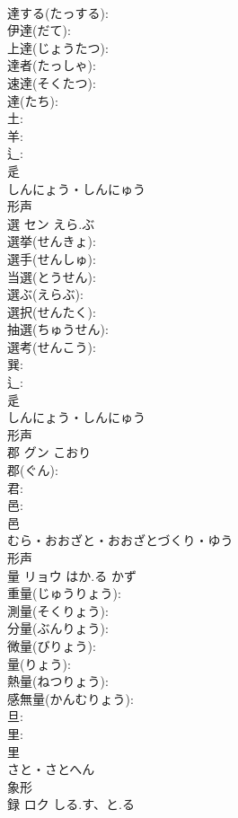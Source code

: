 \documentclass[8pt]{extreport}
\begin{document}
\begin{CJK}{UTF8}{min}
\\	達する(たっする): 
\\	伊達(だて): 
\\	上達(じょうたつ): 
\\	達者(たっしゃ): 
\\	速達(そくたつ): 
\\	達(たち): 
\\	土: 
\\	羊: 
\\	辶: 
\\	辵	
\\	しんにょう・しんにゅう	
\\	形声 
\\	選	セン	えら.ぶ		
\\	選挙(せんきょ): 
\\	選手(せんしゅ): 
\\	当選(とうせん): 
\\	選ぶ(えらぶ): 
\\	選択(せんたく): 
\\	抽選(ちゅうせん): 
\\	選考(せんこう): 
\\	巽: 
\\	辶: 
\\	辵	
\\	しんにょう・しんにゅう	
\\	形声 
\\	郡	グン	こおり		
\\	郡(ぐん): 
\\	君: 
\\	邑: 
\\	邑	
\\	むら・おおざと・おおざとづくり・ゆう	
\\	形声 
\\	量	リョウ	はか.る	かず	
\\	重量(じゅうりょう): 
\\	測量(そくりょう): 
\\	分量(ぶんりょう): 
\\	微量(びりょう): 
\\	量(りょう): 
\\	熱量(ねつりょう): 
\\	感無量(かんむりょう): 
\\	旦: 
\\	里: 
\\	里	
\\	さと・さとへん	
\\	象形 
\\	録	ロク	しる.す、と.る		

\end{CJK}
\end{document}
